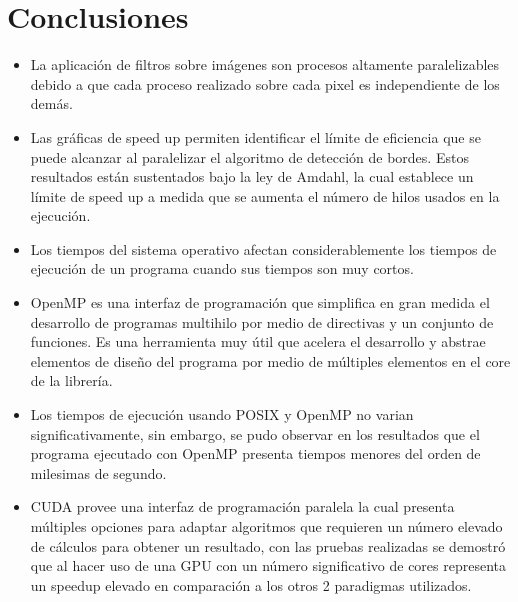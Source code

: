 \section{Conclusiones}

\begin{itemize}
    \item La aplicación de filtros sobre imágenes son procesos altamente paralelizables debido a que cada proceso realizado sobre cada pixel es independiente de los demás.
    \item Las gráficas de speed up permiten identificar el límite de eficiencia que se puede alcanzar al paralelizar el algoritmo de detección de bordes. Estos resultados están sustentados bajo la ley de Amdahl, la cual establece un límite de speed up a medida que se aumenta el número de hilos usados en la ejecución.
    \item Los tiempos del sistema operativo afectan considerablemente los tiempos de ejecución de un programa cuando sus tiempos son muy cortos.
    \item OpenMP es una interfaz de programación que simplifica en gran medida el desarrollo de programas multihilo por medio de directivas y un conjunto de funciones. Es una herramienta muy útil que acelera el desarrollo y abstrae elementos de diseño del programa por medio de múltiples elementos en el core de la librería.
    \item Los tiempos de ejecución usando POSIX y OpenMP no varian significativamente, sin embargo, se pudo observar en los resultados que el programa ejecutado con OpenMP presenta tiempos menores del orden de milesimas de segundo.
    \item CUDA provee una interfaz de programación paralela la cual presenta múltiples opciones para adaptar algoritmos que requieren un número elevado de cálculos para obtener un resultado, con las pruebas realizadas se demostró que al hacer uso de una GPU con un número significativo de cores representa un speedup elevado en comparación a los otros 2 paradigmas utilizados.
\end{itemize}


